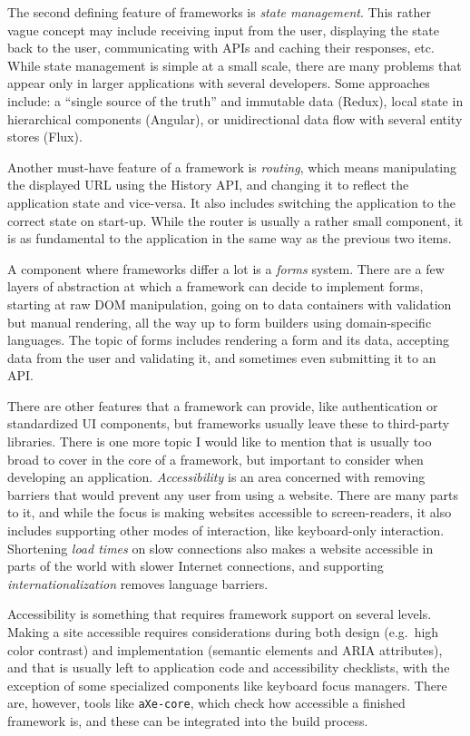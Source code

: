 \documentclass[english,zadani,odsaz]{fitthesis}
\begin{document}
The second defining feature of frameworks is \emph{state management}. This rather vague
concept may include receiving input from the user, displaying the state back to
the user, communicating with APIs and caching their responses, etc. While state
management is simple at a small scale, there are many problems that appear only
in larger applications with several developers. Some approaches include: a
``single source of the truth'' and immutable data (Redux), local state in
hierarchical components (Angular), or unidirectional data flow with several
entity stores (Flux).

Another must-have feature of a framework is \emph{routing}, which means manipulating
the displayed URL using the History API, and changing it to reflect the
application state and vice-versa. It also includes switching the application to
the correct state on start-up. While the router is usually a rather small
component, it is as fundamental to the application in the same way as the previous two
items.

A component where frameworks differ a lot is a \emph{forms} system. There are a few
layers of abstraction at which a framework can decide to implement forms,
starting at raw DOM manipulation, going on to data containers with validation
but manual rendering, all the way up to form builders using domain-specific
languages. The topic of forms includes rendering a form and its data,
accepting data from the user and validating it, and sometimes even submitting it
to an API.

There are other features that a framework can provide, like authentication or
standardized UI components, but frameworks usually leave these to third-party
libraries. There is one more topic I would like to mention that is usually too
broad to cover in the core of a framework, but important to consider when
developing an application. \emph{Accessibility} is an area concerned with removing
barriers that would prevent any user from using a website. There are many parts
to it, and while the focus is making websites accessible to screen-readers, it
also includes supporting other modes of interaction, like keyboard-only
interaction. Shortening \emph{load times} on slow connections also makes a website
accessible in parts of the world with slower Internet connections, and
supporting \emph{internationalization} removes language barriers.

Accessibility is something that requires framework support on several
levels. Making a site accessible requires considerations during both design
(e.g.~high color contrast) and implementation (semantic elements and ARIA
attributes), and that is usually left to application code and accessibility
checklists, with the exception of some specialized components like keyboard
focus managers. There are, however, tools like \texttt{aXe-core}, which check how
accessible a finished framework is, and these can be integrated into the build
process.
\end{document}
